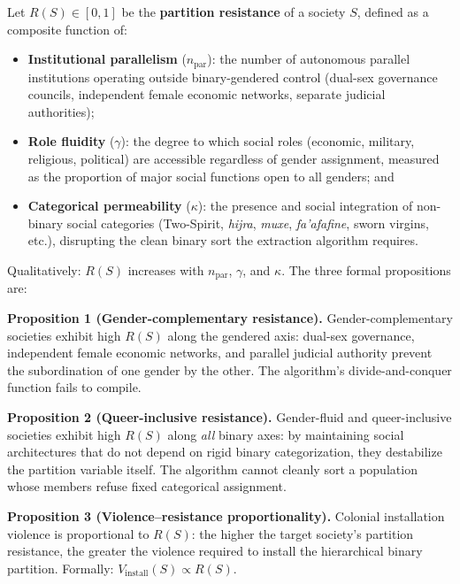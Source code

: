 \begin{definition}
\label{def:structural_immunity}
Let $R(S) \in [0,1]$ be the \textbf{partition resistance} of a society $S$, defined as a composite function of:
\begin{itemize}[leftmargin=*]
    \item \textbf{Institutional parallelism} ($n_{\text{par}}$): the number of autonomous parallel institutions operating outside binary-gendered control (dual-sex governance councils, independent female economic networks, separate judicial authorities);
    \item \textbf{Role fluidity} ($\gamma$): the degree to which social roles (economic, military, religious, political) are accessible regardless of gender assignment, measured as the proportion of major social functions open to all genders; and
    \item \textbf{Categorical permeability} ($\kappa$): the presence and social integration of non-binary social categories (Two-Spirit, \textit{hijra}, \textit{muxe}, \textit{fa'afafine}, sworn virgins, etc.), disrupting the clean binary sort the extraction algorithm requires.
\end{itemize}

\noindent Qualitatively: $R(S)$ increases with $n_{\text{par}}$, $\gamma$, and $\kappa$. The three formal propositions are:

\medskip
\textbf{Proposition 1 (Gender-complementary resistance).}
Gender-complementary societies exhibit high $R(S)$ along the gendered axis: dual-sex governance, independent female economic networks, and parallel judicial authority prevent the subordination of one gender by the other. The algorithm's divide-and-conquer function fails to compile.

\medskip
\textbf{Proposition 2 (Queer-inclusive resistance).}
Gender-fluid and queer-inclusive societies exhibit high $R(S)$ along \textit{all} binary axes: by maintaining social architectures that do not depend on rigid binary categorization, they destabilize the partition variable itself. The algorithm cannot cleanly sort a population whose members refuse fixed categorical assignment.

\medskip
\textbf{Proposition 3 (Violence--resistance proportionality).}
Colonial installation violence is proportional to $R(S)$: the higher the target society's partition resistance, the greater the violence required to install the hierarchical binary partition. Formally: $V_{\text{install}}(S) \propto R(S)$.


\end{definition}
